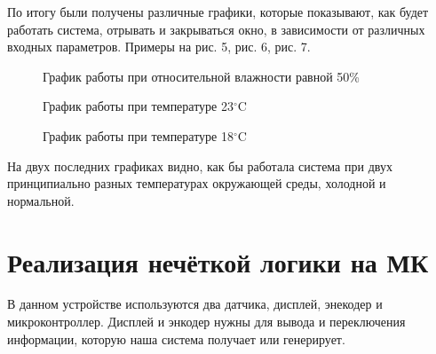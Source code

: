 \documentclass[a4paper]{article}
\begin{document}
\newpage
По итогу были получены различные графики, которые показывают, как будет
работать система, отрывать и закрываться окно, в зависимости от различных
входных параметров. Примеры на рис. 5, рис. 6, рис. 7. 

\begin{figure}[h]
    \caption{График работы при относительной влажности равной 50\%} 
\end{figure}

\begin{figure}[h]
    \caption{График работы при температуре 23$^{\circ}$C} 
\end{figure}

\begin{figure}[h]
    \caption{График работы при температуре 18$^{\circ}$C} 
\end{figure}

На двух последних графиках видно, как бы работала система при двух
принципиально разных температурах окружающей среды, холодной и нормальной.

\newpage
\section{Реализация нечёткой логики на МК}
В данном устройстве используются два датчика, дисплей, энекодер и
микроконтроллер. Дисплей и энкодер нужны для вывода и переключения
информации, которую наша система получает или генерирует.
\end{document}
